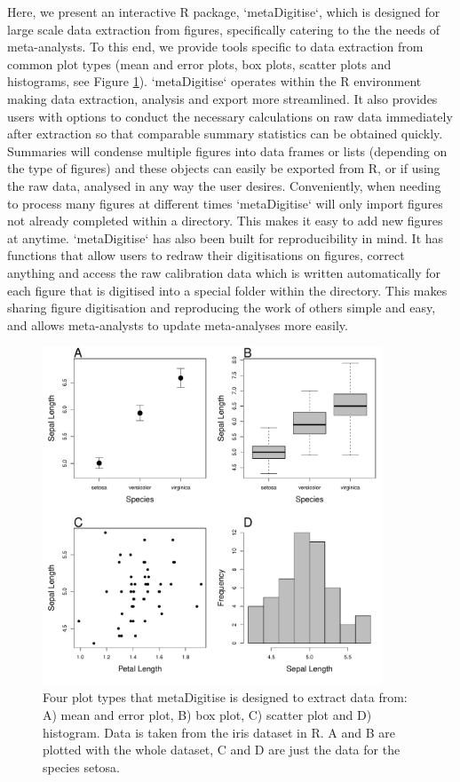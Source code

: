\documentclass{article}
\begin{document}
Here, we present an interactive R package, `metaDigitise`, which is designed for large scale data extraction from figures, specifically catering to the the needs of meta-analysts. To this end, we provide tools specific to data extraction from common plot types (mean and error plots, box plots, scatter plots and histograms, see Figure \ref{fig:plot_type}). `metaDigitise` operates within the R environment making data extraction, analysis and export more streamlined. It also provides users with options to conduct the necessary calculations on raw data immediately after extraction so that comparable summary statistics can be obtained quickly. Summaries will condense multiple figures into data frames or lists (depending on the type of figures) and these objects can easily be exported from R, or if using the raw data, analysed in any way the user desires. Conveniently, when needing to process many figures at different times `metaDigitise` will only import figures not already completed within a directory. This makes it easy to add new figures at anytime. `metaDigitise` has also been built for reproducibility in mind. It has functions that allow users to redraw their digitisations on figures, correct anything and access the raw calibration data which is written automatically for each figure that is digitised into a special folder within the directory. This makes sharing figure digitisation and reproducing the work of others simple and easy, and allows meta-analysts to update meta-analyses more easily.


\begin{figure}[ht] 
 \includegraphics[width=0.9\textwidth]{fig_plot_type.pdf} 
 \caption{Four plot types that metaDigitise is designed to extract data from: A) mean and error plot, B) box plot, C) scatter plot and D) histogram. Data is taken from the iris dataset in R. A and B are plotted with the whole dataset, C and D are just the data for the species setosa.}
\label{fig:plot_type}
\end{figure}
\end{document}
